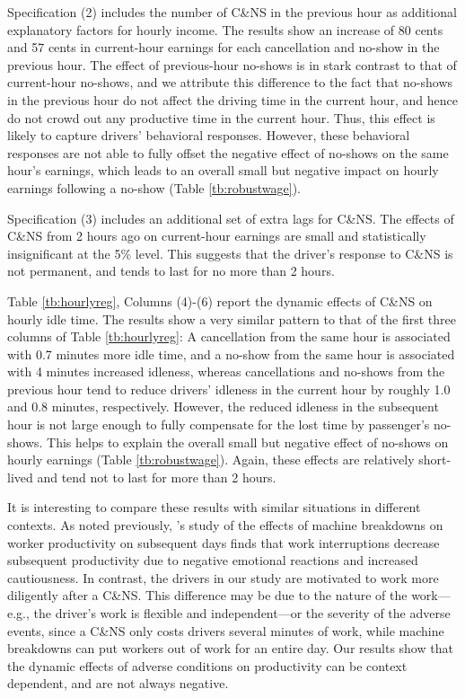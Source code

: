 \documentclass[reviewmode]{restud}
\begin{document}
Specification (2) includes the number of C\&NS in the previous hour as additional explanatory factors for hourly income. The results show an increase of 80 cents and 57 cents in current-hour earnings for each cancellation and no-show in the previous hour. The effect of previous-hour no-shows is in stark contrast to that of current-hour no-shows, and we attribute this difference to the fact that no-shows in the previous hour do not affect the driving time in the current hour, and hence do not crowd out any productive time in the current hour. Thus, this effect is likely to capture drivers' behavioral responses. However, these behavioral responses are not able to fully offset the negative effect of no-shows on the same hour's earnings, which leads to an overall small but negative impact on hourly earnings following a no-show (Table \ref{tb:robustwage}).

Specification (3) includes an additional set of extra lags for C\&NS. The effects of C\&NS from 2 hours ago on current-hour earnings are small and statistically insignificant at the 5\% level. This suggests that the driver's response to C\&NS is not permanent, and tends to last for no more than 2 hours.

Table \ref{tb:hourlyreg}, Columns (4)-(6) report the dynamic effects of C\&NS on hourly idle time. The results show a very similar pattern to that of the first three columns of Table \ref{tb:hourlyreg}: A cancellation from the same hour is associated with 0.7 minutes more idle time, and a no-show from the same hour is associated with 4 minutes increased idleness, whereas cancellations and no-shows from the previous hour tend to reduce drivers' idleness in the current hour by roughly 1.0 and 0.8 minutes, respectively. However, the reduced idleness in the subsequent hour is not large enough to fully compensate for the lost time by passenger's no-shows. This helps to explain the overall small but negative effect of no-shows on hourly earnings (Table \ref{tb:robustwage}).  Again, these effects are relatively short-lived and tend not to last for more than 2 hours.

It is interesting to compare these results with similar situations in different contexts. As noted previously, \citeauthor{cai2017recover}'s \citeyear{cai2017recover} study of the effects of  machine breakdowns on worker productivity on subsequent days finds that work interruptions decrease subsequent productivity due to negative emotional reactions and increased cautiousness. In contrast, the drivers in our study are motivated to work more diligently after a C\&NS. This difference may be due to the nature of the work---e.g., the driver's work is flexible and independent---or the severity of the adverse events, since a C\&NS only costs drivers several minutes of work, while machine breakdowns can put workers out of work for an entire day. Our results show that the dynamic effects of adverse conditions on productivity can be context dependent, and are not always negative.
\end{document}
